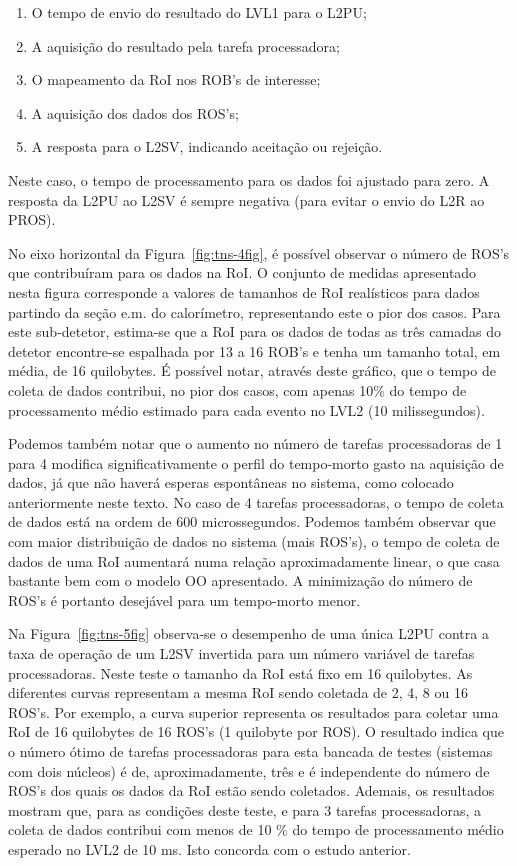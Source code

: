 \begin{enumerate}
\item O tempo de envio do resultado do LVL1 para o L2PU;
\item A aquisição do resultado pela tarefa processadora;
\item O mapeamento da RoI nos ROB's de interesse;
\item A aquisição dos dados dos ROS's;
\item A resposta para o L2SV, indicando aceitação ou rejeição.
\end{enumerate}

Neste caso, o tempo de processamento para os dados foi ajustado para zero. A
resposta da L2PU ao L2SV é sempre negativa (para evitar o envio do L2R ao
PROS). 

No eixo horizontal da Figura~\ref{fig:tns-4fig}, é possível observar o número
de ROS's que contribuíram para os dados na RoI. O conjunto de medidas
apresentado nesta figura corresponde a valores de tamanhos de RoI realísticos
para dados partindo da seção e.m. do calorímetro, representando este o pior
dos casos. Para este sub-detetor, estima-se que a RoI para os dados de todas
as três camadas do detetor encontre-se espalhada por 13 a 16 ROB's e tenha um
tamanho total, em média, de 16 quilobytes. É possível notar, através
deste gráfico, que o tempo de coleta de dados contribui, no pior dos casos,
com apenas 10\% do tempo de processamento médio estimado para cada evento no
LVL2 (10 milissegundos).

Podemos também notar que o aumento no número de tarefas processadoras de 1
para 4 modifica significativamente o perfil do tempo-morto gasto na aquisição
de dados, já que não haverá esperas espontâneas no sistema, como colocado
anteriormente neste texto. No caso de 4 tarefas processadoras, o tempo de
coleta de dados está na ordem de 600 microssegundos. Podemos também observar
que com maior distribuição de dados no sistema (mais ROS's), o tempo de
coleta de dados de uma RoI aumentará numa relação aproximadamente linear, o
que casa bastante bem com o modelo OO apresentado. A minimização do número de
ROS's é portanto desejável para um tempo-morto menor.

Na Figura~\ref{fig:tns-5fig} observa-se o desempenho de uma única L2PU contra
a taxa de operação de um L2SV invertida para um número variável de tarefas
processadoras. Neste teste o tamanho da RoI está fixo em 16 quilobytes. As
diferentes curvas representam a mesma RoI sendo coletada de 2, 4, 8 ou 16
ROS's. Por exemplo, a curva superior representa os resultados para coletar uma
RoI de 16 quilobytes de 16 ROS's (1 quilobyte por ROS). O resultado
indica que o número ótimo de tarefas processadoras para esta bancada de testes
(sistemas com dois núcleos) é de, aproximadamente, três e é independente
do número de ROS's dos quais os dados da RoI estão sendo coletados. Ademais,
os resultados mostram que, para as condições deste teste, e para 3 tarefas
processadoras, a coleta de dados contribui com menos de 10
\% do tempo de processamento médio esperado no LVL2 de 10 ms. Isto concorda
com o estudo anterior.

